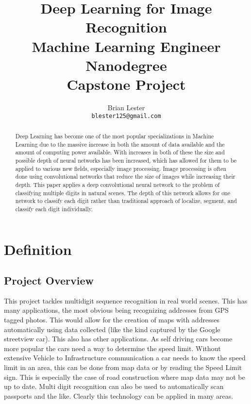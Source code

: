 \documentclass[12pt,twocolumn,letterpaper]{article}
\begin{document}
\title{{\huge Deep Learning for Image Recognition} \\
Machine Learning Engineer Nanodegree \\
Capstone Project}

\author{Brian Lester\\
{\tt\small blester125@gmail.com}}

\maketitle

\begin{abstract}
   Deep Learning has become one of the most popular specializations in Machine 
   Learning due to the massive increase in both the amount of data available and 
   the amount of computing power available. With increases in both of these the 
   size and possible depth of neural networks has been increased, which has allowed for 
   them to be applied to various new fields, especially image processing. Image
   processing is often done using convolutional networks that reduce the size of
   images while increasing their depth. This paper applies a deep convolutional 
   neural network to the problem of classifying multiple digits in natural 
   scenes. The depth of this network allows for one network to classify each 
   digit rather than traditional approach of localize, segment, and classify 
   each digit individually. 
\end{abstract}

\section{Definition}
\subsection{Project Overview}
This project tackles multidigit sequence recognition in real world scenes. This 
has many applications, the most obvious being recognizing addresses from GPS 
tagged photos. This would allow for the creation of maps with addresses 
automatically using data collected (like the kind captured by the Google streetview car). 
This also has other applications. As self driving cars become more popular the 
cars need a way to determine the speed limit. Without extensive Vehicle to 
Infrastructure communication a car needs to know the speed limit in an area, this 
can be done from map data or by reading the Speed Limit sign. This is especially 
the case of road construction where map data may not be up to date. Multi digit 
recognition can also be used to automatically scan passports and the like. 
Clearly this technology can be applied in many areas.
\end{document}

